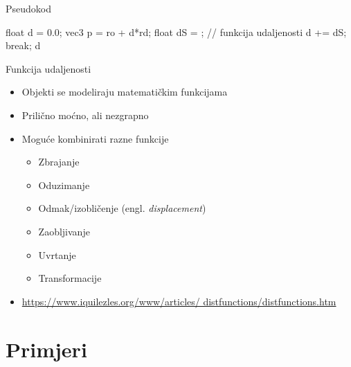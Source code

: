 \documentclass[12pt]{beamer}
\begin{document}
  \begin{frame}{Pseudokod}
    \begin{algorithm}[H]
      \caption{Funkcija Raymarch}
      \begin{algorithmic}[1]
          \State float d = 0.0;
            \State vec3 p = ro + d*rd;
            \State float dS = ; // funkcija udaljenosti
            \State d += dS;
              \State break;
            \EndIf
          \EndFor
          \State \Return d
        \EndFunction
      \end{algorithmic}
      \label{alg:raymarch}
    \end{algorithm}
  \end{frame}

  \begin{frame}{Funkcija udaljenosti}
    \begin{itemize}
    \item Objekti se modeliraju matematičkim funkcijama
    \item Prilično moćno, ali nezgrapno
    \item Moguće kombinirati razne funkcije
          \begin{itemize}
          \item Zbrajanje
          \item Oduzimanje
          \item Odmak/izobličenje (engl. {\sl displacement}\/)
          \item Zaobljivanje
          \item Uvrtanje
          \item Transformacije
          \end{itemize}
        \item \href{https://www.iquilezles.org/www/articles/distfunctions/distfunctions.htm}{https://www.iquilezles.org/www/articles/
                 distfunctions/distfunctions.htm}
    \end{itemize}
  \end{frame}

  \section{Primjeri}
\end{document}
